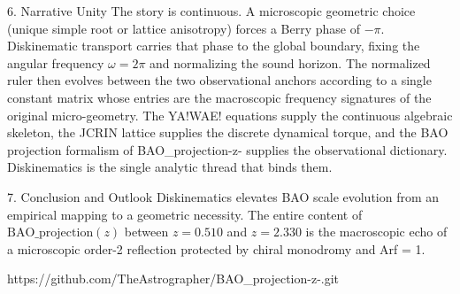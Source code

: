 6. Narrative Unity
The story is continuous. A microscopic geometric choice (unique simple root or lattice anisotropy) forces a Berry phase of \(-\pi\). Diskinematic transport carries that phase to the global boundary, fixing the angular frequency \(\omega=2\pi\) and normalizing the sound horizon. The normalized ruler then evolves between the two observational anchors according to a single constant matrix whose entries are the macroscopic frequency signatures of the original micro-geometry. The YA!WAE! equations supply the continuous algebraic skeleton, the JCRIN lattice supplies the discrete dynamical torque, and the BAO projection formalism of BAO_projection-z- supplies the observational dictionary. Diskinematics is the single analytic thread that binds them.

7. Conclusion and Outlook
Diskinematics elevates BAO scale evolution from an empirical mapping to a geometric necessity. The entire content of \(\mathrm{BAO\_projection}(z)\) between \(z=0.510\) and \(z=2.330\) is the macroscopic echo of a microscopic order-2 reflection protected by chiral monodromy and Arf = 1.

https://github.com/TheAstrographer/BAO_projection-z-.git
